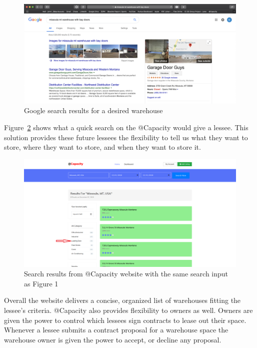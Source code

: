 \begin{figure}[H]
\centering
\includegraphics[width=.75\textwidth]{Phase_3/screenshot.png}
\caption{Google search results for a desired warehouse}
\label{fig:screenshot}
\end{figure}

Figure~\ref{fig:loading} shows what a quick search on the @Capacity would give a lessee. This solution provides these future lessees the flexibility to tell us what they want to store, where they want to store, and when they want to store it.  

\begin{figure}[tbh]
\centering
\includegraphics[width=.75\textwidth]{Phase_3/loading}
\caption{Search results from @Capacity website with the same search input as Figure 1}
\label{fig:loading}
\end{figure} 

Overall the website delivers a concise, organized list of warehouses fitting the lessee's criteria. @Capacity also provides flexibility to owners as well. Owners are given the power to control which lessees sign contracts to lease out their space. Whenever a lessee submits a contract proposal for a warehouse space the warehouse owner is given the power to accept, or decline any proposal.

  
